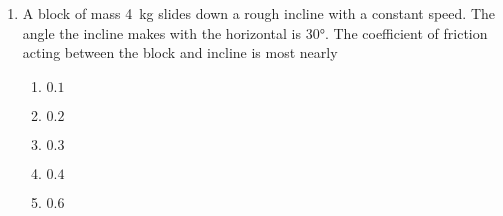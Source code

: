 \documentclass{../../oss-apphys}
\begin{document}
\begin{multicols}{2}
\begin{enumerate}[resume,leftmargin=18pt]
    \columnbreak
    
  \item A block of mass \SI{4}{\kilo\gram} slides down a rough incline with a
    constant speed. The angle the incline makes with the horizontal is
    \ang{30}. The coefficient of friction acting between the block and incline
    is most nearly
    \begin{center}
    \end{center}
    \begin{enumerate}[noitemsep,topsep=0pt,leftmargin=18pt,label=(\Alph*)]
    \item $0.1$
    \item $0.2$
    \item $0.3$
    \item $0.4$
    \item $0.6$
    \end{enumerate}



\end{enumerate}
\end{multicols}
\end{document}
